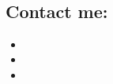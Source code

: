 
\begin{titlepage}

\begin{centering}
    
  \huge  \projectname \\
    
\end{centering}

\subsection*{Contact me:}
\begin{itemize}
  \item \linkedin
  
  \item \github
  
  \item \email
  
\end{itemize}


\end{titlepage}